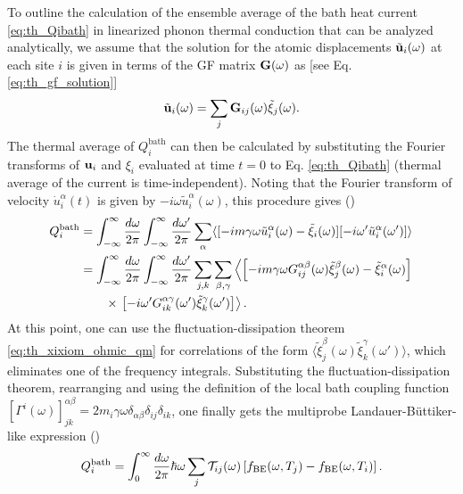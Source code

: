 To outline the calculation of the ensemble average of the bath heat current \eqref{eq:th_Qibath} in linearized phonon thermal conduction that can be analyzed analytically, we assume that the solution for the atomic displacements $\tilde{\mathbf{u}}_i(\omega)$ at each site $i$ is given in terms of the GF matrix $\mathbf{G}(\omega)$ as [see Eq. \eqref{eq:th_gf_solution}]
\begin{equation}
 \tilde{\mathbf{u}}_i(\omega) = \sum_{j} \mathbf{G}_{ij}(\omega) \tilde{\xi}_j(\omega).
\end{equation}
The thermal average of $Q_i^{\textrm{bath}}$ can then be calculated by substituting the Fourier transforms of $\mathbf{u}_i$ and $\xi_i$ evaluated at time $t=0$ to Eq. \eqref{eq:th_Qibath} (thermal average of the current is time-independent). Noting that the Fourier transform of velocity $\dot{u}_i^{\alpha}(t)$ is given by $-i\omega \tilde{u}^{\alpha}_i(\omega)$, this procedure gives ()
\begin{alignat}{2}
 Q_i^{\textrm{bath}}  &= \int_{-\infty}^{\infty} \frac{d\omega}{2\pi} \int_{-\infty}^{\infty} \frac{d\omega'}{2\pi} \sum_{\alpha} \langle  [ -im\gamma\omega \tilde u_i^{\alpha}(\omega)-\tilde \xi_i(\omega)][-i\omega' \tilde u_i^{\alpha}(\omega')] \rangle \\
  &= \int_{-\infty}^{\infty} \frac{d\omega}{2\pi} \int_{-\infty}^{\infty} \frac{d\omega'}{2\pi} \sum_{j,k} \sum_{\beta,\gamma} \left\langle \left[ -im\gamma\omega G_{ij}^{\alpha\beta}(\omega)\tilde \xi_j^{\beta}(\omega)-\tilde \xi_i^{\alpha}(\omega) \right] \right. \notag \\
  &\qquad \times \left.\left[-i\omega' G_{ik}^{\alpha\gamma}(\omega') \tilde \xi_k^{\gamma}(\omega') \right]  \right\rangle .
\end{alignat}
At this point, one can use the fluctuation-dissipation theorem \eqref{eq:th_xixiom_ohmic_qm} for correlations of the form $\langle \tilde \xi_j^{\beta}(\omega)\tilde \xi_k^{\gamma}(\omega') \rangle$, which eliminates one of the frequency integrals. Substituting the fluctuation-dissipation theorem, rearranging and using the definition of the local bath coupling function $[\Gamma^i(\omega)]_{jk}^{\alpha\beta}=2m_i\gamma\omega \delta_{\alpha\beta}\delta_{ij} \delta_{ik}$, one finally gets the multiprobe Landauer-B\"uttiker-like \cite{landauer57,buttiker92} expression ()
\begin{equation}
  Q_i^{\textrm{bath}} = \int_0^{\infty} \frac{d\omega}{2\pi} \hbar \omega  \sum_j \mathcal{T}_{ij}(\omega) \left[ f_{\textrm{BE}}(\omega,T_j)- f_{\textrm{BE}}(\omega,T_i)\right]. \label{eq:th_QI}
\end{equation}
